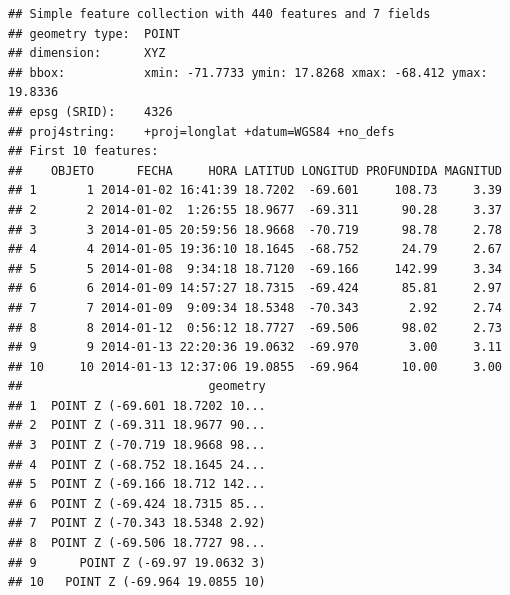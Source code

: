 \documentclass[11pt,]{article}
\newenvironment{Shaded}{\begin{snugshade}}{\end{snugshade}}
\newcommand{\KeywordTok}[1]{\textcolor[rgb]{0.13,0.29,0.53}{\textbf{#1}}}
\newcommand{\DataTypeTok}[1]{\textcolor[rgb]{0.13,0.29,0.53}{#1}}
\newcommand{\OperatorTok}[1]{\textcolor[rgb]{0.81,0.36,0.00}{\textbf{#1}}}
\newcommand{\NormalTok}[1]{#1}
\begin{document}
\begin{verbatim}
## Simple feature collection with 440 features and 7 fields
## geometry type:  POINT
## dimension:      XYZ
## bbox:           xmin: -71.7733 ymin: 17.8268 xmax: -68.412 ymax: 19.8336
## epsg (SRID):    4326
## proj4string:    +proj=longlat +datum=WGS84 +no_defs
## First 10 features:
##    OBJETO      FECHA     HORA LATITUD LONGITUD PROFUNDIDA MAGNITUD
## 1       1 2014-01-02 16:41:39 18.7202  -69.601     108.73     3.39
## 2       2 2014-01-02  1:26:55 18.9677  -69.311      90.28     3.37
## 3       3 2014-01-05 20:59:56 18.9668  -70.719      98.78     2.78
## 4       4 2014-01-05 19:36:10 18.1645  -68.752      24.79     2.67
## 5       5 2014-01-08  9:34:18 18.7120  -69.166     142.99     3.34
## 6       6 2014-01-09 14:57:27 18.7315  -69.424      85.81     2.97
## 7       7 2014-01-09  9:09:34 18.5348  -70.343       2.92     2.74
## 8       8 2014-01-12  0:56:12 18.7727  -69.506      98.02     2.73
## 9       9 2014-01-13 22:20:36 19.0632  -69.970       3.00     3.11
## 10     10 2014-01-13 12:37:06 19.0855  -69.964      10.00     3.00
##                          geometry
## 1  POINT Z (-69.601 18.7202 10...
## 2  POINT Z (-69.311 18.9677 90...
## 3  POINT Z (-70.719 18.9668 98...
## 4  POINT Z (-68.752 18.1645 24...
## 5  POINT Z (-69.166 18.712 142...
## 6  POINT Z (-69.424 18.7315 85...
## 7  POINT Z (-70.343 18.5348 2.92)
## 8  POINT Z (-69.506 18.7727 98...
## 9      POINT Z (-69.97 19.0632 3)
## 10   POINT Z (-69.964 19.0855 10)
\end{verbatim}

\begin{Shaded}
\end{Shaded}
\end{document}
